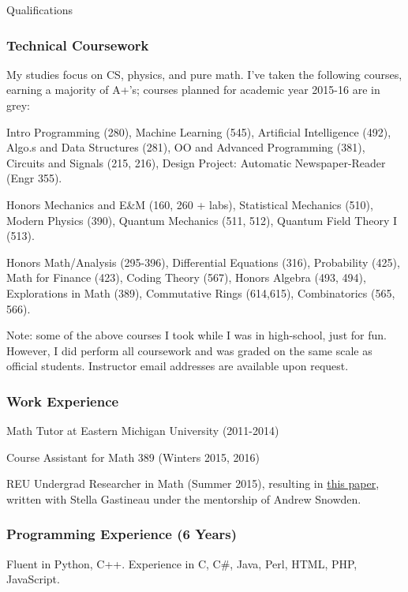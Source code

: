 \documentclass[12pt]{article}
\begin{document}
\begin{section}{Qualifications}
 \subsubsection*{Technical Coursework}
  My studies focus on CS, physics, and pure math. I've taken the following courses, earning a majority of A+'s; courses planned for academic year 2015-16 are in grey:
  \begin{description}
   \item Intro Programming (280), Machine Learning (545), {\color{gray} Artificial Intelligence (492),
         Algo.s and Data Structures (281), OO and Advanced Programming (381), Circuits and Signals (215, 216), Design Project: Automatic Newspaper-Reader (Engr 355).}

  \item Honors Mechanics and E\&M (160, 260 + labs), Statistical Mechanics (510), Modern Physics (390),
        Quantum Mechanics (511, 512), {\color{gray} Quantum Field Theory I (513).}

  \item Honors Math/Analysis (295-396), Differential Equations (316), Probability (425), Math for Finance (423),
        Coding Theory (567), Honors Algebra (493, 494), Explorations in Math (389),
        {\color{gray} Commutative Rings (614,615), Combinatorics (565, 566).}
  \end{description}
  Note: some of the above courses I took while I was in high-school, just for fun. However, I did perform all coursework and was graded on the same scale as official students. Instructor email addresses are available upon request.


 \subsubsection*{Work Experience}
  \begin{description}
  \item Math Tutor at Eastern Michigan University (2011-2014)
  \item Course Assistant for Math 389 (Winters 2015, {\color{gray}2016})
  \item REU Undergrad Researcher in Math (Summer 2015), resulting in \href{http://arxiv.org/abs/1510.08337}{this paper}, written with Stella Gastineau under the mentorship of Andrew Snowden.
  \end{description}

 \subsubsection*{Programming Experience (6 Years)}
  Fluent in Python, C++. Experience in C, C\#, Java, Perl, HTML, PHP, JavaScript.
  

\end{section}
\end{document}
